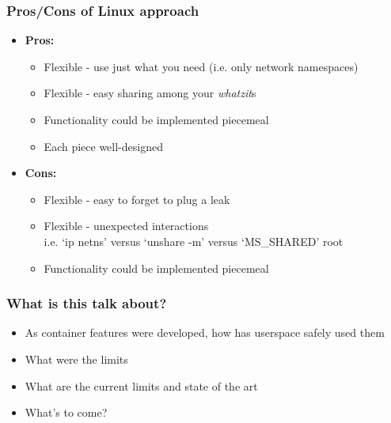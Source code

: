\documentclass{beamer}
\begin{document}
\begin{frame}
\frametitle{Pros/Cons of Linux approach}
\begin{itemize}
  \item {\bf Pros:}
    \begin{itemize}
      \item Flexible - use just what you need (i.e. only network namespaces)
      \item Flexible - easy sharing among your {\em whatzit}s
      \item Functionality could be implemented piecemeal
      \item Each piece well-designed
    \end{itemize}
\pause
  \item {\bf Cons:}
    \begin{itemize}
      \item Flexible - easy to forget to plug a leak
      \item Flexible - unexpected interactions \\
        i.e. `ip netns' versus `unshare -m' versus `MS\_SHARED' root
      \item Functionality could be implemented piecemeal
    \end{itemize}
\end{itemize}

\end{frame}

\begin{frame}
\frametitle{What is this talk about?}
\begin{itemize}
  \item As container features were developed, how has userspace safely used them
  \item What were the limits
  \item What are the current limits and state of the art
  \item What's to come?
\end{itemize}

\end{frame}
\end{document}
